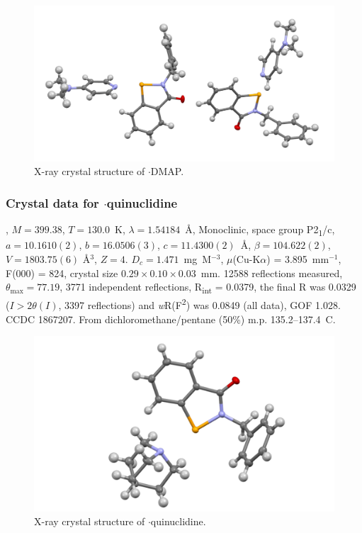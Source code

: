 \begin{refsection}
    \begin{figure}
      \includegraphics[width=0.6\linewidth]{Figures/ebs-bn-dmap-xtal.pdf}
      \caption{X-ray crystal structure of \texorpdfstring{$ \cdot $DMAP}{C21H21N3OSe}.}
    \end{figure}
    
    \subsubsection{Crystal data for \texorpdfstring{$ \cdot $quinuclidine}{C21H24N2OSe}}
    , $M=399.38$, $T=130.0$~K, $\lambda=1.54184$~\AA, Monoclinic, space group P2\textsubscript{1}/c, $a = 10.1610(2)$, $b = 16.0506(3)$, $c = 11.4300(2)$~\AA, $\beta = 104.622(2)$\degree, $V = 1803.75(6)$ \AA$^{3}$, $Z = 4$.
    $D_{c}= 1.471$~mg~M$^{-3}$, $\mu$(Cu-K$\alpha$) = 3.895~mm$^{-1}$, F(000) = 824, crystal size $0.29 \times 0.10 \times 0.03$~mm.
    12588 reflections measured, $\theta_{\max} = 77.19$\degree, 3771 independent reflections, R\textsubscript{int} = 0.0379, the final R was 0.0329 ($I > 2\theta(I)$, 3397 reflections) and \textit{w}R(F\textsuperscript{2}) was 0.0849 (all data), GOF 1.028.
    CCDC 1867207.
    From dichloromethane/pentane (50\%) m.p. 135.2--137.4~\degree{}C.
    
    \begin{figure}
      \includegraphics[width=0.6\linewidth]{Figures/ebs-bn-quin-xtal.pdf}
      \caption{X-ray crystal structure of \texorpdfstring{$ \cdot $quinuclidine}{C21H24N2OSe}.}
    \end{figure}
    

\end{refsection}
